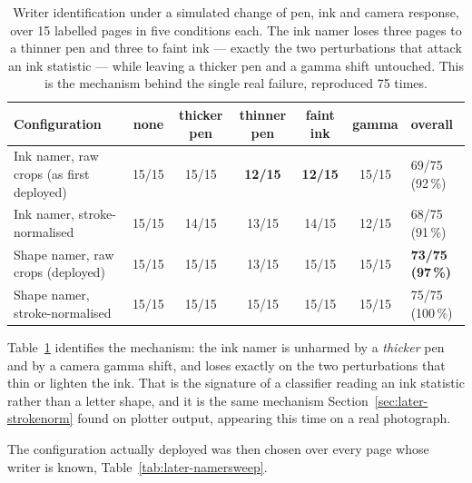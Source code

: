 \begin{table}[!htbp]
\centering
\fontsize{8.5}{10.2}\selectfont
\setlength{\tabcolsep}{4pt}
\begin{tabularx}{\linewidth}{|p{2.5cm}|c|c|c|c|c|X|}
\hline
\textbf{Configuration} & \textbf{none} & \textbf{thicker pen} & \textbf{thinner pen} & \textbf{faint ink} & \textbf{gamma} & \textbf{overall} \\
\hline
Ink namer, raw crops (as first deployed) & 15/15 & 15/15 & \textbf{12/15} & \textbf{12/15} & 15/15 & 69/75 (92\,\%) \\
\hline
Ink namer, stroke-normalised & 15/15 & 14/15 & 13/15 & 14/15 & 12/15 & 68/75 (91\,\%) \\
\hline
Shape namer, raw crops (deployed) & 15/15 & 15/15 & 13/15 & 15/15 & 15/15 & \textbf{73/75 (97\,\%)} \\
\hline
Shape namer, stroke-normalised & 15/15 & 15/15 & 15/15 & 15/15 & 15/15 & 75/75 (100\,\%) \\
\hline
\end{tabularx}
\caption{Writer identification under a simulated change of pen, ink and camera response, over 15 labelled pages in five conditions each. The ink namer loses three pages to a thinner pen and three to faint ink --- exactly the two perturbations that attack an ink statistic --- while leaving a thicker pen and a gamma shift untouched. This is the mechanism behind the single real failure, reproduced 75 times.}
\label{tab:later-robust}
\end{table}

Table~\ref{tab:later-robust} identifies the mechanism: the ink namer is unharmed by a \emph{thicker} pen and by a camera gamma shift, and loses exactly on the two perturbations that thin or lighten the ink. That is the signature of a classifier reading an ink statistic rather than a letter shape, and it is the same mechanism Section~\ref{sec:later-strokenorm} found on plotter output, appearing this time on a real photograph.

The configuration actually deployed was then chosen over every page whose writer is known, Table~\ref{tab:later-namersweep}.


